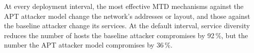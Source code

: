 \documentclass{cshonours}
\begin{document}
At every deployment interval, the most effective MTD mechanisms against the
APT attacker model change the network's addresses or layout, and those against
the baseline attacker change its services. At the default interval, service
diversity reduces the number of hosts the baseline attacker compromises by
92\,\%, but the number the APT attacker model compromises by 36\,\%.
\end{document}
